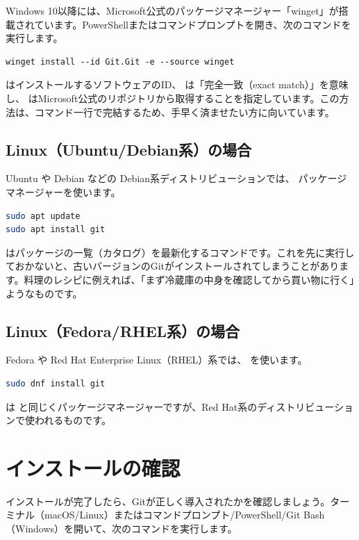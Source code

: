 Windows 10以降には、Microsoft公式のパッケージマネージャー「winget」が搭載されています。PowerShellまたはコマンドプロンプトを開き、次のコマンドを実行します。

\begin{lstlisting}[language={}]
winget install --id Git.Git -e --source winget
\end{lstlisting}

 はインストールするソフトウェアのID、 は「完全一致（exact match）」を意味し、 はMicrosoft公式のリポジトリから取得することを指定しています。この方法は、コマンド一行で完結するため、手早く済ませたい方に向いています。

\subsection{Linux（Ubuntu/Debian系）の場合}

Ubuntu や Debian などの Debian系ディストリビューションでは、 パッケージマネージャーを使います。

\begin{lstlisting}[language=bash]
sudo apt update
sudo apt install git
\end{lstlisting}

 はパッケージの一覧（カタログ）を最新化するコマンドです。これを先に実行しておかないと、古いバージョンのGitがインストールされてしまうことがあります。料理のレシピに例えれば、「まず冷蔵庫の中身を確認してから買い物に行く」ようなものです。

\subsection{Linux（Fedora/RHEL系）の場合}

Fedora や Red Hat Enterprise Linux（RHEL）系では、 を使います。

\begin{lstlisting}[language=bash]
sudo dnf install git
\end{lstlisting}

 は  と同じくパッケージマネージャーですが、Red Hat系のディストリビューションで使われるものです。

\section{インストールの確認}

インストールが完了したら、Gitが正しく導入されたかを確認しましょう。ターミナル（macOS/Linux）またはコマンドプロンプト/PowerShell/Git Bash（Windows）を開いて、次のコマンドを実行します。

